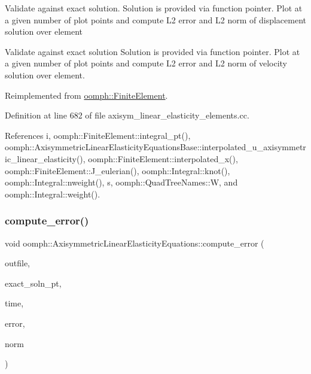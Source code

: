 Validate against exact solution. Solution is provided via function pointer. Plot at a given number of plot points and compute L2 error and L2 norm of displacement solution over element

Validate against exact solution Solution is provided via function pointer. Plot at a given number of plot points and compute L2 error and L2 norm of velocity solution over element. 

Reimplemented from \hyperlink{classoomph_1_1FiniteElement_a73c79a1f1e5b1d334757812a6bbd58ff}{oomph\+::\+Finite\+Element}.



Definition at line 682 of file axisym\+\_\+linear\+\_\+elasticity\+\_\+elements.\+cc.



References i, oomph\+::\+Finite\+Element\+::integral\+\_\+pt(), oomph\+::\+Axisymmetric\+Linear\+Elasticity\+Equations\+Base\+::interpolated\+\_\+u\+\_\+axisymmetric\+\_\+linear\+\_\+elasticity(), oomph\+::\+Finite\+Element\+::interpolated\+\_\+x(), oomph\+::\+Finite\+Element\+::\+J\+\_\+eulerian(), oomph\+::\+Integral\+::knot(), oomph\+::\+Integral\+::nweight(), s, oomph\+::\+Quad\+Tree\+Names\+::W, and oomph\+::\+Integral\+::weight().

\mbox{\label{classoomph_1_1AxisymmetricLinearElasticityEquations_ad6a1568c8d02d11a25c4b19c9f6763a2}} 
\subsubsection{\texorpdfstring{compute\+\_\+error()}{compute\_error()}\hspace{0.1cm}{\footnotesize\ttfamily [2/2]}}
{\footnotesize\ttfamily void oomph\+::\+Axisymmetric\+Linear\+Elasticity\+Equations\+::compute\+\_\+error (\begin{DoxyParamCaption}\item[{std\+::ostream \&}]{outfile,  }\item[{\hyperlink{classoomph_1_1FiniteElement_ad4ecf2b61b158a4b4d351a60d23c633e}{Finite\+Element\+::\+Unsteady\+Exact\+Solution\+Fct\+Pt}}]{exact\+\_\+soln\+\_\+pt,  }\item[{const double \&}]{time,  }\item[{double \&}]{error,  }\item[{double \&}]{norm }\end{DoxyParamCaption})\hspace{0.3cm}{\ttfamily [virtual]}}

